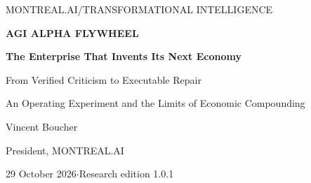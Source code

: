 \documentclass[11pt,letterpaper]{article}
\begin{document}
\thispagestyle{plain}
\begin{center}
{\small MONTREAL.AI\quad /\quad TRANSFORMATIONAL INTELLIGENCE}\par\vspace{0.7em}
{\fontsize{25}{29}\selectfont\bfseries AGI ALPHA FLYWHEEL}\par\vspace{0.35em}
{\Large\bfseries The Enterprise That Invents Its Next Economy}\par\vspace{0.6em}
{\large From Verified Criticism to Executable Repair}\par
{\normalsize An Operating Experiment and the Limits of Economic Compounding}\par\vspace{0.8em}
{\large Vincent Boucher}\par
President, MONTREAL.AI\par\vspace{0.4em}
29 October 2026\quad$\cdot$\quad Research edition 1.0.1\par
\end{center}

\clearpage\begingroup\small\setlength{\parskip}{0pt}\tableofcontents\endgroup\clearpage

\end{document}
